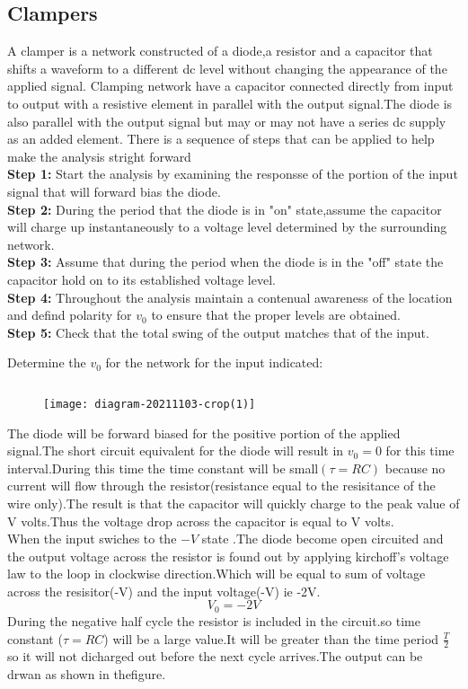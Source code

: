 \subsection{Clampers}
A clamper is a network constructed of a diode,a resistor and a capacitor that shifts a waveform to a different dc level without changing the appearance of the applied signal. Clamping network have a capacitor connected directly from input to output with a resistive element in parallel with the output signal.The diode is also parallel with the output signal but may or may not have a series dc supply as an added element. There is a sequence of steps that can be applied to help make the analysis stright forward\\
\textbf{Step 1: } Start the analysis by examining the responsse of the portion of the input signal that will forward bias the diode.\\
\textbf{Step 2: } During the period that the diode is in "on" state,assume the capacitor will charge up instantaneously to a voltage level determined by the surrounding network.\\
\textbf{Step 3: } Assume that during the period when the diode is in the "off" state the capacitor hold on to its established voltage level.\\
\textbf{Step 4: } Throughout the analysis maintain a contenual awareness of the location and defind polarity for $v_{0}$ to ensure that the proper levels are obtained.\\
\textbf{Step 5: } Check that the total swing of the output matches that of the input.
\begin{exercise}
Determine the $v_{0}$ for the network for the input indicated:
\end{exercise}
\begin{answer}$\left. \right. $
\begin{figure}[H]
	\centering
	\texttt{[image: diagram-20211103-crop(1)]}
\end{figure}
The diode will be forward biased for the positive portion of the applied signal.The short circuit equivalent for the diode will result in $v_{0}=0$ for this time interval.During this time the time constant will be small$(\tau=RC)$ because no current will flow through the resistor(resistance equal to the resisitance of the wire only).The result is that the capacitor will quickly charge to the peak value of V volts.Thus the voltage drop across the capacitor is equal to V volts.
\\ When the input swiches to the $-V$ state .The diode become open circuited and the output voltage across the resistor is found out by applying kirchoff's voltage law to the loop in clockwise direction.Which will be equal to sum of voltage across the resisitor(-V) and the input voltage(-V) ie -2V.
$$V_{0}=-2V$$
During the negative half cycle the resistor is included in the circuit.so time constant ($\tau=RC$) will be a large value.It will be greater than the time period $\frac{T}{2}$ so it will not dicharged out before the next cycle arrives.The output can be drwan as shown in thefigure.
\end{answer}
